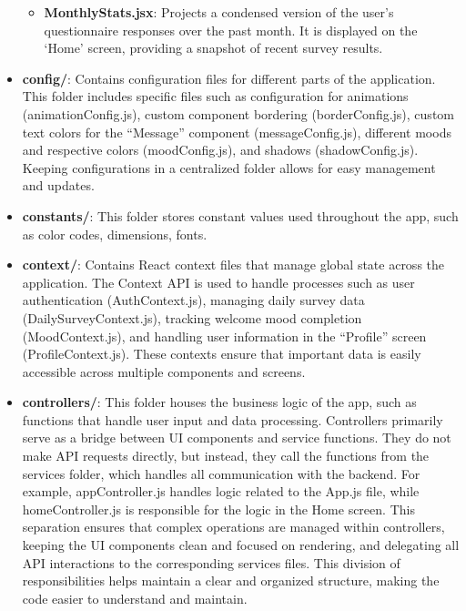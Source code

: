 \begin{itemize}
\begin{itemize}
        \item \textbf{MonthlyStats.jsx}: Projects a condensed version of the user’s questionnaire responses over the past month. It is displayed on the `Home' screen, providing a snapshot of recent survey results.
    \end{itemize}
        

    \item \textbf{config/}: Contains configuration files for different parts of the application. This folder includes specific files such as configuration for animations (animationConfig.js), custom component bordering (borderConfig.js), custom text colors for the ``Message'' component (messageConfig.js), different moods and respective colors (moodConfig.js), and shadows (shadowConfig.js). Keeping configurations in a centralized folder allows for easy management and updates.

    \item \textbf{constants/}: This folder stores constant values used throughout the app, such as color codes, dimensions, fonts.

    \item \textbf{context/}: Contains React context files that manage global state across the application. The Context API is used to handle processes such as user authentication (AuthContext.js), managing daily survey data (DailySurveyContext.js), tracking welcome mood completion (MoodContext.js), and handling user information in the ``Profile'' screen (ProfileContext.js). These contexts ensure that important data is easily accessible across multiple components and screens.

    \item \textbf{controllers/}: This folder houses the business logic of the app, such as functions that handle user input and data processing. Controllers primarily serve as a bridge between UI components and service functions. They do not make API requests directly, but instead, they call the functions from the services folder, which handles all communication with the backend. For example, appController.js handles logic related to the App.js file, while homeController.js is responsible for the logic in the Home screen. This separation ensures that complex operations are managed within controllers, keeping the UI components clean and focused on rendering, and delegating all API interactions to the corresponding services files. This division of responsibilities helps maintain a clear and organized structure, making the code easier to understand and maintain.


\end{itemize}
